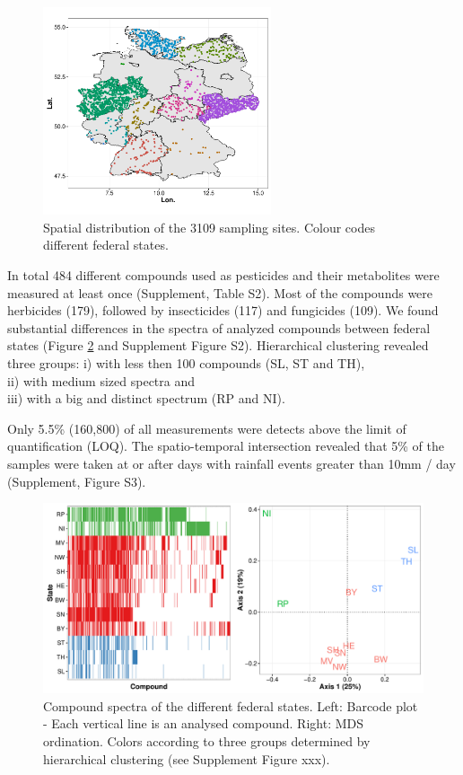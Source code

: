 \documentclass[journal=esthag,manuscript=article]{achemso}
\begin{document}
\begin{figure}[ht]
  \includegraphics[width=0.6\textwidth]{figure1.pdf}
  \caption{Spatial distribution of the 3109 sampling sites. Colour codes different federal states.}
  \label{fig:fig1}
\end{figure}

In total 484 different compounds used as pesticides and their metabolites were measured at least once (Supplement, Table S2). 
Most of the compounds were herbicides (179), followed by insecticides (117) and fungicides (109).
We found substantial differences in the spectra of analyzed compounds between federal states (Figure \ref{fig:fig2} and Supplement Figure S2).
Hierarchical clustering revealed three groups:
i) with less then 100 compounds (SL, ST and TH), \\
%
%
ii) with medium sized spectra and \\
iii) with a big and distinct spectrum (RP and NI).

Only 5.5\% (160,800) of all measurements were detects above the limit of quantification (LOQ).
The spatio-temporal intersection revealed that 5\% of the samples were taken at or after days with rainfall events greater than 10mm / day (Supplement, Figure S3).

\begin{figure}[ht]
  \includegraphics[width=\textwidth]{figure2.pdf}
  \caption{Compound spectra of the different federal states. Left: Barcode plot - Each vertical line is an analysed compound. Right: MDS ordination. 
  Colors according to three groups determined by hierarchical clustering (see Supplement Figure xxx).}
  \label{fig:fig2}
\end{figure}
\end{document}
